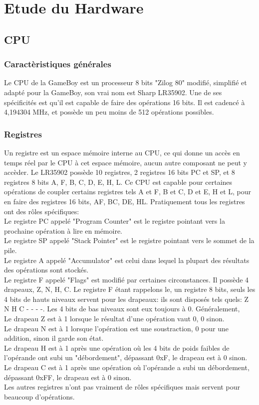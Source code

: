 \documentclass{report}
\begin{document}
\chapter{Etude du Hardware}
\section{CPU}
\subsection{Caractèristiques générales}
Le CPU de la GameBoy est un processeur 8 bits "Zilog 80" modifié, simplifié et adapté pour la GameBoy, son vrai nom est Sharp LR35902.
Une de ses spécificités est qu'il est capable de faire des opérations 16 bits.
Il est cadencé à 4,194304 MHz, et possède un peu moins de 512 opérations possibles.
\subsection{Registres}

Un registre est un espace mémoire interne au CPU, ce qui donne un accès en temps réel par le CPU à cet espace mémoire, aucun autre composant ne peut y accèder.
Le LR35902 possède 10 registres, 2 registres 16 bits PC et SP, et 8 registres 8 bits A, F, B, C, D, E, H, L.
Ce CPU est capable pour certaines opérations de coupler certains registres tels A et F, B et C, D et E, H et L, pour en faire des registres 16 bits, AF, BC, DE, HL.
Pratiquement tous les registres ont des rôles spécifiques:\\
Le registre PC appelé "Program Counter" est le registre pointant vers la prochaine opération à lire en mémoire.\\
Le registre SP appelé "Stack Pointer" est le registre pointant vers le sommet de la pile.\\
Le registre A appelé "Accumulator" est celui dans lequel la plupart des résultats des opérations sont stockés.\\
Le registre F appelé "Flags" est modifié par certaines circonstances.
Il possède 4 drapeaux, Z, N, H, C.
Le registre F étant rappelons le, un registre 8 bits, seuls les 4 bits de hauts niveaux servent pour les drapeaux:
ils sont disposés tels quels: Z N H C - - - -. Les 4 bits de bas niveaux sont eux toujours à 0.
Généralement, \\Le drapeau Z est à 1 lorsque le résultat d'une opération vaut 0, 0 sinon.\\
Le drapeau N est à 1 lorsque l'opération est une soustraction, 0 pour une addition, sinon il garde son état.\\
Le drapeau H est à 1 après une opération où les 4 bits de poids faibles de l'opérande ont subi un "débordement", dépassant 0xF, le drapeau est à 0 sinon.\\
Le drapeau C est à 1 après une opération où l'opérande a subi un débordement, dépassant 0xFF, le drapeau est à 0 sinon.\\
Les autres registres n'ont pas vraiment de rôles spécifiques mais servent pour beaucoup d'opérations.
\end{document}
